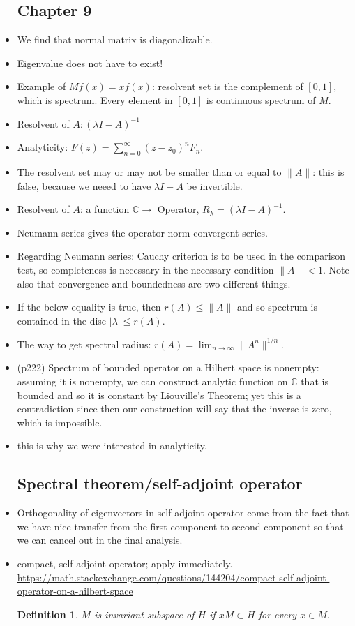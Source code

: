 \documentclass{article}
\newtheorem{definition}{Definition}
\theoremstyle{remark}
\begin{document}
\begin{itemize}
\subsection*{Chapter 9}

\item We find that normal matrix is diagonalizable. 
\item Eigenvalue does not have to exist!
\item Example of $Mf(x)=xf(x)$: resolvent set is the complement of $[0,1]$, which is spectrum. Every element in $[0,1]$ is continuous spectrum of $M$.
\item Resolvent of $A: (\lambda I-A)^{-1}$
\item Analyticity: $F(z)=\sum^{\infty}_{n=0} (z-z_0)^n F_n$.
\item The resolvent set may or may not be smaller than or equal to $\lVert A\rVert$: this is false, because we neeed to have $\lambda I-A$ be invertible.
\item Resolvent of $A$: a function $\mathbb{C}\to$ Operator, $R_\lambda=(\lambda I-A)^{-1}$.
\item Neumann series gives the operator norm convergent series.

\item Regarding Neumann series: Cauchy criterion is to be used in the comparison test, so completeness is necessary in the necessary condition $\lVert A\rVert<1$. Note also that convergence and boundedness are two different things.

\item If the below equality is true, then $r(A)\leq \lVert A\rVert$ and so spectrum is contained in the disc $\mid\lambda\mid\leq r(A)$.

\item The way to get spectral radius: $r(A)=\lim_{n\to\infty}\lVert A^n\rVert^{1/n}$.

\item (p222) Spectrum of bounded operator on a Hilbert space is nonempty: assuming it is nonempty, we can construct analytic function on $\mathbb{C}$ that is bounded and so it is constant by Liouville's Theorem; yet this is a contradiction since then our construction will say that the inverse is zero, which is impossible.

\item this is why we were interested in analyticity.

\subsection*{Spectral theorem/self-adjoint operator}
\item Orthogonality of eigenvectors in self-adjoint operator come from the fact that we have nice transfer from the first component to second component so that we can cancel out in the final analysis.
\item compact, self-adjoint operator; apply immediately.
\url{https://math.stackexchange.com/questions/144204/compact-self-adjoint-operator-on-a-hilbert-space}
\begin{definition}
$M$ is invariant subspace of $H$ if $xM\subset H$ for every $x\in M$.
\end{definition}


\end{itemize}
\end{document}
